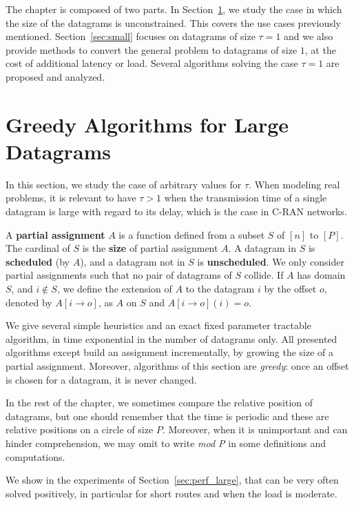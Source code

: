 The chapter is composed of two parts. In Section~\ref{sec:large}, we study the case in which the size of the datagrams is unconstrained. This covers the use cases previously mentioned. Section~\ref{sec:small} focuses on datagrams of size $\tau = 1$ and we also provide methods to convert the general problem to datagrams of size $1$, at the cost of additional latency or load. Several algorithms solving the case $\tau = 1$ are proposed and analyzed.

\section{Greedy Algorithms for Large Datagrams} \label{sec:large}

In this section, we study the case of arbitrary values for $\tau$. When modeling real problems,
it is relevant to have $\tau > 1$ when the transmission time of a single datagram is large with regard to its delay,
which is the case in C-RAN networks.

A \textbf{partial assignment} $A$ is a function defined from a subset $S$ of $[n]$ to $[P]$.
The cardinal of $S$ is the \textbf{size} of partial assignment $A$. A datagram in $S$ is \textbf{scheduled} (by $A$), and a datagram not in $S$ is \textbf{unscheduled}. We only consider partial assignments such that no pair of datagrams of $S$ collide. If $A$ has domain $S$, and $i \notin S$, we define the extension of $A$ to the datagram $i$ by the offset $o$, denoted by $A[i \rightarrow o]$, as $A$ on $S$ and $A[i \rightarrow o](i) = o$.

  We give several simple heuristics and an exact fixed parameter tractable algorithm, in time exponential in the number of datagrams only. All presented algorithms except \exactresolution build an assignment incrementally, by growing the size of a partial assignment. Moreover, algorithms of this section are \emph{greedy}: once an offset is chosen for a datagram, it is never changed. 

In the rest of the chapter, we sometimes compare the relative position of datagrams, but one should remember that the
time is periodic and these are relative positions on a circle of size $P$. Moreover, when it is unimportant and can hinder comprehension, we may omit to write \emph{mod P} in some definitions and computations.

We show in the experiments of Section~\ref{sec:perf_large}, that \pma can be very often solved positively, in particular for short routes and when the load is moderate.



